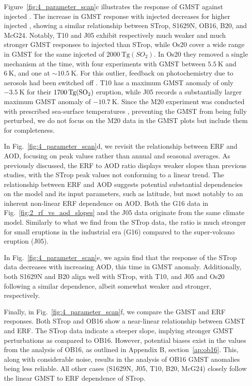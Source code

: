 \documentclass[draft]{agujournal2019}
\begin{document}
  Figure~\ref{fig:4_parameter_scan}c illustrates the response of GMST against injected
  . The increase in GMST response with injected  decreases for higher
  injected , showing a similar relationship between STrop, S1629N, OB16, B20,
  and McG24. Notably, T10 and J05 exhibit respectively much weaker and much stronger
  GMST responses to injected  than STrop, while Os20 cover a wide range in GMST
  for the same injceted  of \(\SI{2000}{\tera\gram(SO_{2})}\). In Os20 they
  removed a single mechanism at the time, with four experiments with GMST between
  \(\SI{5.5}{\kelvin}\) and \(\SI{6}{\kelvin}\), and one at \(\sim \SI{10.5}{\kelvin}\).
  For this outlier, feedback on photochemistry due to aerosols had been switched off
  \cite{osipov2020}. T10 has a maximum GMST anomaly of only \(\SI{-3.5}{\kelvin}\) for
  their \(\SI{1700}{\tera\gram(\ce{SO2})}\) eruption, while J05 records a substantially
  larger maximum GMST anomaly of \(\SI{-10.7}{\kelvin}\). Since the M20 experiment was
  conducted with prescribed sea-surface temperatures \cite{marshall2020}, preventing the
  GMST from being fully perturbed,  we do not focus on the M20
  data in the GMST plots but include them for completeness.

  In Fig.~\ref{fig:4_parameter_scan}d, we revisit the relationship between ERF and AOD,
  focusing on peak values rather than annual and seasonal averages. As previously
  discussed, the ERF to AOD ratio displays weaker slopes than previous studies, with the
  STrop peak values not conforming to a linear trend. The relationship between ERF and
  AOD suggests potential substantial dependencies on the model and its input parameters,
  such as latitude, but most notably to an inherent non-linear ERF dependence on AOD.
  Both the G16 data in Fig.~\ref{fig:2_rf_vs_aod_slopes} and the J05 data originate from
  the same climate model. Similarly to what we find from the STrop data, the ratio is
  much stronger for small eruptions in the industrial era (G16) compared to the
  super-volcano eruption (J05).

  In Fig.~\ref{fig:4_parameter_scan}e, we again find that the response of the STrop data
  decreases with increasing AOD, this time in GMST anomaly. Additionally, both S1629N
  and B20 align well with STrop, with T10, and J05 and Os20 following a similar
  dependence, albeit somewhat weaker and stronger, respectively.

  Finally, in Fig.~\ref{fig:4_parameter_scan}f, we compare the GMST and ERF responses.
  Both STrop and OB16 show a near-linear relationship between GMST and ERF. The STrop
  data indicate a steeper slope, implying stronger GMST perturbations as compared to
  OB16. However, potential biases exist in the values from the analysis of OB16, as
  outlined in Appendix B, section~\ref{ap:ob16}. This, along with considerable noise,
  results in the analysis of OB16 GMST anomalies being less reliable. All other cases
  (S1629N, J05, T10, B20, McG24) closely follow the linear GMST to ERF dependence of
  STrop.
\end{document}

